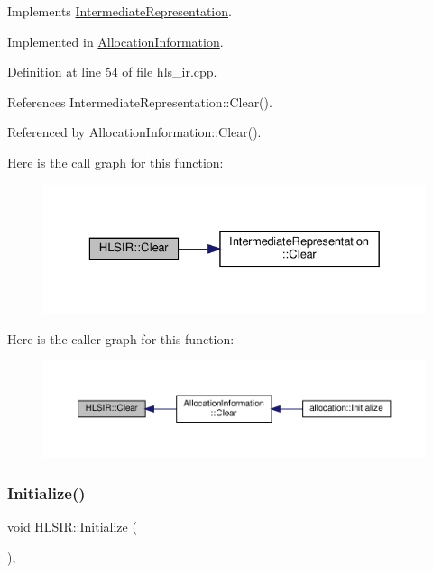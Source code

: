 Implements \hyperlink{classIntermediateRepresentation_a93091bd456d4ca43bdbd41016c728c0d}{Intermediate\+Representation}.



Implemented in \hyperlink{classAllocationInformation_a2a8dda2a075950424083d9aff01267fe}{Allocation\+Information}.



Definition at line 54 of file hls\+\_\+ir.\+cpp.



References Intermediate\+Representation\+::\+Clear().



Referenced by Allocation\+Information\+::\+Clear().

Here is the call graph for this function\+:
\nopagebreak
\begin{figure}[H]
\begin{center}
\leavevmode
\includegraphics[width=329pt]{d0/d25/classHLSIR_afba475e313250d56bec388077d032624_cgraph}
\end{center}
\end{figure}
Here is the caller graph for this function\+:
\nopagebreak
\begin{figure}[H]
\begin{center}
\leavevmode
\includegraphics[width=350pt]{d0/d25/classHLSIR_afba475e313250d56bec388077d032624_icgraph}
\end{center}
\end{figure}
\mbox{\label{classHLSIR_a37c3471e94bbb635d9fac51cca161225}} 
\subsubsection{\texorpdfstring{Initialize()}{Initialize()}}
{\footnotesize\ttfamily void H\+L\+S\+I\+R\+::\+Initialize (\begin{DoxyParamCaption}{ }\end{DoxyParamCaption})\hspace{0.3cm}{\ttfamily [override]}, {}}



